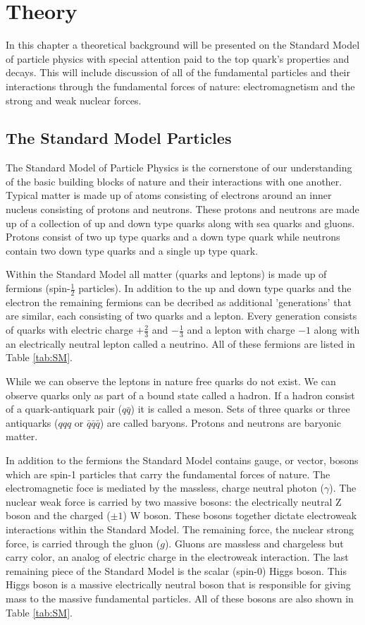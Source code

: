 
\chapter{Theory}
\label{ch:Theory}

In this chapter a theoretical background will be presented on the Standard Model of particle physics with special attention paid to the top quark's properties and decays.  This will include discussion of all of the fundamental particles and their interactions through the fundamental forces of nature: electromagnetism and the strong and weak nuclear forces.

\section{The Standard Model Particles}
\label{SMParticles}
The Standard Model of Particle Physics is the cornerstone of our understanding of the basic building blocks of nature and their interactions with one another.  Typical matter is made up of atoms consisting of electrons around an inner nucleus consisting of protons and neutrons.  These protons and neutrons are made up of a collection of up and down type quarks along with sea quarks and gluons.  Protons consist of two up type quarks and a down type quark while neutrons contain two down type quarks and a single up type quark.  

Within the Standard Model all matter (quarks and leptons) is made up of fermions (spin-$\frac{1}{2}$ particles).  In addition to the up and down type quarks and the electron the remaining fermions can be decribed as additional 'generations' that are similar, each consisting of two quarks and a lepton.  Every generation consists of quarks with electric charge $+\frac{2}{3}$ and $-\frac{1}{3}$ and a lepton with charge $-1$ along with an electrically neutral lepton called a neutrino.  All of these fermions are listed in Table \ref{tab:SM}.  

While we can observe the leptons in nature free quarks do not exist.  We can observe quarks only as part of a bound state called a hadron.  If a hadron consist of a quark-antiquark pair ($q\bar{q}$) it is called a meson.  Sets of three quarks or three antiquarks ($qqq$ or $\bar{q}\bar{q}\bar{q}$) are called baryons.  Protons and neutrons are baryonic matter.

In addition to the fermions the Standard Model contains gauge, or vector, bosons which are spin-1 particles that carry the fundamental forces of nature.  The electromagnetic foce is mediated by the massless, charge neutral photon ($\gamma$). The nuclear weak force is carried by two massive bosons: the electrically neutral Z boson and the charged ($\pm 1$) W boson.  These bosons together dictate electroweak interactions within the Standard Model.  The remaining force, the nuclear strong force, is carried through the gluon ($g$).  Gluons are massless and chargeless but carry color, an analog of electric charge in the electroweak interaction.  The last remaining piece of the Standard Model is the scalar (spin-0) Higgs boson.  This Higgs boson is a massive electrically neutral boson that is responsible for giving mass to the massive fundamental particles.  All of these bosons are also shown in Table \ref{tab:SM}.  

